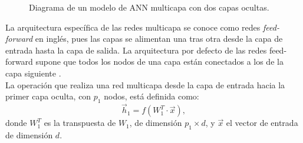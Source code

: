 \begin{figure}[ht]
    \centering
    \caption{Diagrama de un modelo de \acs{ANN} multicapa con dos capas ocultas.}
    \label{fig:nnlayers}
\end{figure}

La arquitectura específica de las redes multicapa se conoce como redes \emph{feed-forward} en inglés, pues las capas se alimentan una tras otra desde la capa de entrada hasta la capa de salida. La arquitectura por defecto de las redes feed-forward supone que todos los nodos de una capa están conectados a los de la capa siguiente \cite{Nielsen:2018}.
\\
La operación que realiza una red multicapa desde la capa de entrada hacia la primer capa oculta, con $p_1$ nodos, está definida como:
$$\vec{h}_1 = f(W^T_1 \cdot \vec{x}),$$
donde $W^T_1$ es la transpuesta de $W_1$, de dimensión $p_1 \times d$, y $\vec{x}$ el vector de entrada de dimensión $d$.

